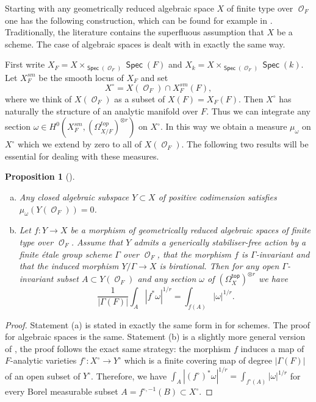\documentclass{article}
\DeclareMathOperator{\Spec}{\mathsf{Spec}}
\DeclareMathOperator{\Oo}{\mathcal{O}}
\renewcommand{\top}{\mathsf{top}}
\theoremstyle{definition}
\theoremstyle{plain}
\newtheorem{proposition}[definition]{Proposition}
\begin{document}
Starting with any geometrically reduced algebraic space $X$ of finite type over $\Oo_F$ one has the following construction, which can be found for example in \cite[Section 4]{Yasuda:2014aa}. Traditionally, the literature contains the superfluous assumption that $X$ be a scheme. The case of algebraic spaces is dealt with in exactly the same way.

First write $X_F=X\times_{\Spec(\Oo_F)} \Spec(F)$ and $X_{k}=X\times_{\Spec(\Oo_F)} \Spec(k)$. Let $X_F^{sm}$ be the smooth locus of $X_F$ and set
\[ X^\circ= X(\Oo_F) \cap X_F^{sm}(F),\]
where we think of $X(\Oo_F)$ as a subset of $X(F) = X_F(F)$. Then $X^\circ$ has naturally the structure of an analytic manifold over $F$. Thus we can integrate any section $\omega \in H^0(X_F^{sm},(\Omega^{top}_{X/F})^{\otimes r})$ on $X^\circ$. In this way we obtain a measure $\mu_\omega$ on $X^\circ$ which we extend by zero to all of $X(\Oo_F)$. The following two results will be essential for dealing with these measures.

\begin{proposition}[{\cite[Lemma 4.3, Theorem 4.8]{Yasuda:2014aa}\label{intools}}]

 \begin{enumerate}[(a)]
\item\label{measurezero} Any closed algebraic subspace $Y \subset X$ of positive codimension satisfies $\mu_{\omega}(Y(\Oo_F)) = 0$.
\item\label{chovg} Let $f:Y \rightarrow X$ be a morphism of geometrically reduced algebraic spaces of finite type over $\Oo_F$. Assume that $Y$ admits a generically stabiliser-free action by a finite \'etale group scheme $\Gamma$ over $\Oo_F$, that the morphism $f$ is $\Gamma$-invariant and that the induced morphism $Y/\Gamma \rightarrow X$ is birational. Then for any open $\Gamma$-invariant subset $A \subset Y(\Oo_F)$ and any section $\omega$ of $(\Omega_X^{\top})^{\otimes r}$ we have
\[ \frac{1}{|\Gamma(F)|} \int_{A} |f^*\omega|^{1/r} = \int_{f(A)} |\omega|^{1/r}.\]
\end{enumerate}
\end{proposition}

\begin{proof}
Statement (a) is stated in exactly the same form in \cite[Lemma 4.3]{Yasuda:2014aa} for schemes. The proof for algebraic spaces is the same. Statement (b) is a slightly more general version of \cite[Theorem 4.8]{Yasuda:2014aa}, the proof follows the exact same strategy: the morphism $f$ induces a map of $F$-analytic varieties $f^{\circ}\colon X^{\circ} \to Y^{\circ}$ which is a finite covering map of degree $|\Gamma(F)|$ of an open subset of $Y^{\circ}$. Therefore, we have
$\int_{A} |(f^\circ)^*\omega|^{1/r} = \int_{f^{\circ}(A)} |\omega|^{1/r}$ for every Borel measurable subset $A = f^{\circ,-1}(B) \subset X^{\circ}$.
\end{proof}
\end{document}
